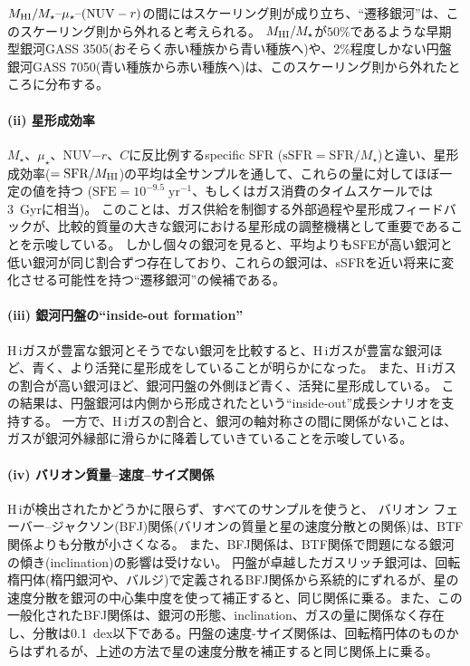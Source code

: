 $M_{\rm HI}/M_\star\mbox{--}\mu_\star\mbox{--} ({\rm NUV}-r)$の間にはスケーリング則が成り立ち、``遷移銀河''は、このスケーリング則から外れると考えられる。
$M_{\rm HI}/M_\star$が$50$\%であるような早期型銀河GASS 3505(おそらく赤い種族から青い種族へ)や、$2$\%程度しかない円盤銀河GASS 7050(青い種族から赤い種族へ)は、このスケーリング則から外れたところに分布する。


\paragraph{(ii) 星形成効率 \citep{2010MNRAS.408..919S}}

$M_\star$、$\mu_\star$、NUV$-r$、$C$に反比例するspecific SFR ($\mbox{sSFR} = \mbox{SFR}/M_\star$)と違い、星形成効率($=\mbox{SFR}/M_{\rm HI}$)の平均は全サンプルを通して、これらの量に対してほぼ一定の値を持つ ($\mbox{SFE}=10^{-9.5}\;\mbox{yr}^{-1}$、もしくはガス消費のタイムスケールでは3~Gyrに相当)。
このことは、ガス供給を制御する外部過程や星形成フィードバックが、比較的質量の大きな銀河における星形成の調整機構として重要であることを示唆している。
しかし個々の銀河を見ると、平均よりもSFEが高い銀河と低い銀河が同じ割合ずつ存在しており、これらの銀河は、sSFRを近い将来に変化させる可能性を持つ``遷移銀河''の候補である。


\paragraph{(iii) 銀河円盤の``inside-out formation'' \citep{2011MNRAS.412.1081W}}

H\,{\sc i}ガスが豊富な銀河とそうでない銀河を比較すると、H\,{\sc i}ガスが豊富な銀河ほど、青く、より活発に星形成をしていることが明らかになった。
また、H\,{\sc i}ガスの割合が高い銀河ほど、銀河円盤の外側ほど青く、活発に星形成している。
この結果は、円盤銀河は内側から形成されたという``inside-out''成長シナリオを支持する。
一方で、H\,{\sc i}ガスの割合と、銀河の軸対称さの間に関係がないことは、ガスが銀河外縁部に滑らかに降着していきていることを示唆している。

\paragraph{(iv) バリオン質量--速度--サイズ関係 \citep{2012A&A...544A..65C}}

H\,{\sc i}が検出されたかどうかに限らず、すべてのサンプルを使うと、
バリオン フェーバー--ジャクソン(BFJ)関係(バリオンの質量と星の速度分散との関係)は、BTF関係よりも分散が小さくなる。
また、BFJ関係は、BTF関係で問題になる銀河の傾き(inclination)の影響は受けない。
円盤が卓越したガスリッチ銀河は、回転楕円体(楕円銀河や、バルジ)で定義されるBFJ関係から系統的にずれるが、星の速度分散を銀河の中心集中度を使って補正すると、同じ関係に乗る。また、この一般化されたBFJ関係は、銀河の形態、inclination、ガスの量に関係なく存在し、分散は0.1~dex以下である。円盤の速度-サイズ関係は、回転楕円体のものからはずれるが、上述の方法で星の速度分散を補正すると同じ関係上に乗る。

